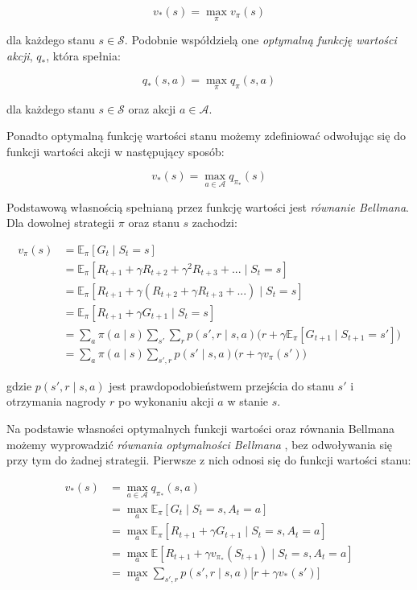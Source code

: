 \documentclass[licencjacka]{pracamgr}
\begin{document}
$$ v_{\ast}(s) = \max_{\pi} v_{\pi}(s) $$

dla każdego stanu $s \in \mathcal{S}$. Podobnie współdzielą one \emph{optymalną funkcję wartości akcji}, $q_{\ast}$, która spełnia:

$$ q_{\ast}(s, a) = \max_{\pi} q_{\pi}(s, a) $$

dla każdego stanu $s \in \mathcal{S}$ oraz akcji $a \in \mathcal{A}$.

Ponadto optymalną funkcję wartości stanu możemy zdefiniować odwołując się do funkcji wartości akcji w następujący sposób:

$$ v_{\ast}(s) = \max_{a \in \mathcal{A}} q_{\pi_{\ast}}(s) $$

Podstawową własnością spełnianą przez funkcję wartości jest \emph{równanie Bellmana}. Dla dowolnej strategii $\pi$ oraz stanu $s$ zachodzi:

\begin{align}
v_{\pi}(s) &= \mathbb{E}_{\pi}[G_t \mid S_t = s]  \nonumber \\
&= \mathbb{E}_{\pi}[R_{t+1} + \gamma R_{t+2} + \gamma^2 R_{t+3} + ... \mid S_t = s]  \nonumber \\
&= \mathbb{E}_{\pi}[R_{t+1} + \gamma (R_{t+2} + \gamma R_{t+3} + ... ) \mid S_t = s]  \nonumber \\
&= \mathbb{E}_{\pi}[R_{t+1} + \gamma G_{t+1} \mid S_t = s] \nonumber \\
&= \sum_a \pi(a \mid s) \sum_{s'} \sum_r p(s', r \mid s, a) \Big(r + \gamma \mathbb{E}_{\pi}[G_{t+1} \mid S_{t+1} = s' ]\Big) \nonumber \\
&= \sum_a \pi(a \mid s) \sum_{s', r} p(s'\mid s, a) \Big(r + \gamma v_{\pi}(s') \Big)
\end{align}

gdzie $ p(s', r \mid s, a) $ jest prawdopodobieństwem przejścia do stanu $s'$ i  otrzymania nagrody $r$ po wykonaniu akcji $a$ w stanie $s$.

Na podstawie własności optymalnych funkcji wartości oraz równania Bellmana możemy wyprowadzić \emph{równania optymalności Bellmana} \cite{bellman1954, bellman1957}, bez odwoływania się przy tym do żadnej strategii. Pierwsze z nich odnosi się do funkcji wartości stanu:

\begin{align}
v_{\ast}(s) &= \max_{a \in \mathcal{A}} q_{\pi_{\ast}}(s, a) \nonumber \\
&= \max_a \mathbb{E}_{\pi}[G_t \mid S_t = s, A_t = a]  \nonumber \\
&= \max_a \mathbb{E}_{\pi}[R_{t+1} + \gamma G_{t+1} \mid S_t = s, A_t = a] \nonumber \\
&= \max_a \mathbb{E}[R_{t+1} + \gamma v_{\pi_{\ast}}(S_{t+1}) \mid S_t = s, A_t = a] \nonumber \\
&= \max_a \sum_{s', r} p(s', r \mid s, a) \Big[r + \gamma v_{\ast}(s') \Big]
\end{align}
\end{document}
